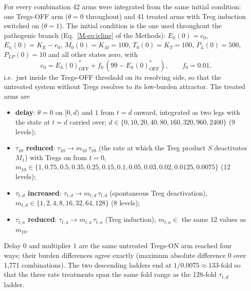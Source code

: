 \documentclass[11pt]{article}
\begin{document}
For every combination 42 arms were integrated from the same initial condition:
one Tregs-OFF arm ($\theta=0$ throughout) and 41 treated arms
with Treg induction switched on ($\theta=1$). The initial
condition is the one used throughout the pathogenic branch
(Eq.~\ref{M-eq:icline} of the Methods): $E_h(0)=e_0$, $E_n(0)=K_E-e_0$, $M_0(0)=K_M=100$,
$T_0(0)=K_T=100$, $P_L(0)=500$, $P_{LP}(0)=10$ and all other states zero, with
\begin{equation}
e_0 = E_h(0)^*_{\mathrm{OFF}} + f_0\,(99 - E_h(0)^*_{\mathrm{OFF}}),\qquad f_0=0.01,
\label{eq:harm-e0}
\end{equation}
i.e.\ just inside the Tregs-OFF threshold on its resolving side, so that the
untreated system without Tregs resolves to its low-burden attractor. The treated
arms are
\begin{itemize}
\item \textbf{delay}: $\theta=0$ on $[0,d)$ and $1$ from $t=d$
  onward, integrated as two legs with the state at $t=d$ carried over;
  $d\in\{0,\allowbreak 10,\allowbreak 20,\allowbreak 40,\allowbreak 80,\allowbreak 160,\allowbreak 320,\allowbreak 960,\allowbreak 2400\}$ (9 levels);
\item \textbf{$\tau_{10}$ reduced}: $\tau_{10}\to m_{10}\,\tau_{10}$ (the rate at which
  the Treg product $S$ deactivates $M_1$) with Tregs on from $t=0$,
  $m_{10}\in\{1,\allowbreak 0.75,\allowbreak 0.5,\allowbreak 0.35,\allowbreak 0.25,\allowbreak 0.15,\allowbreak 0.1,\allowbreak 0.05,\allowbreak 0.03,\allowbreak 0.02,\allowbreak 0.0125,\allowbreak 0.0075\}$ (12 levels);
\item \textbf{$\tau_{t,d}$ increased}: $\tau_{t,d}\to m_{t,d}\,\tau_{t,d}$ (spontaneous
  Treg deactivation), $m_{t,d}\in\{1,\allowbreak 2,\allowbreak 4,\allowbreak 8,\allowbreak 16,\allowbreak 32,\allowbreak 64,\allowbreak 128\}$ (8 levels);
\item \textbf{$\tau_{t,a}$ reduced}: $\tau_{t,a}\to m_{t,a}\,\tau_{t,a}$ (Treg induction),
  $m_{t,a}\in$ the same 12 values as $m_{10}$.
\end{itemize}
Delay $0$ and multiplier $1$ are the same untreated Tregs-ON arm reached four
ways; their burden differences agree exactly (maximum absolute difference 0 over
1,771 combinations). The two descending ladders end at $1/0.0075\approx 133$-fold
so that the three rate treatments span the same fold range as the 128-fold
$\tau_{t,d}$ ladder.
\end{document}

